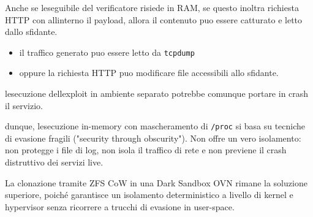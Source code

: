 Anche se l\textquotesingle eseguibile del verificatore risiede in RAM,
se questo inoltra richiesta HTTP con all\textquotesingle interno il
payload, allora il contenuto puo\textquotesingle{} essere catturato e
letto dallo sfidante.

\begin{itemize}
\tightlist
\item
  il traffico generato puo\textquotesingle{} essere letto da
  \passthrough{\lstinline!tcpdump!}
\item
  oppure la richiesta HTTP puo\textquotesingle{} modificare file
  accessibili allo sfidante.
\end{itemize}

l\textquotesingle esecuzione dell\textquotesingle exploit in ambiente
separato potrebbe comunque portare in crash il servizio.

dunque, l\textquotesingle esecuzione in-memory con mascheramento di
\passthrough{\lstinline!/proc!} si basa su tecniche di evasione fragili
("security through obscurity"). Non offre un vero isolamento: non
protegge i file di log, non isola il traffico di rete e non previene il
crash distruttivo dei servizi live.

La clonazione tramite ZFS CoW in una Dark Sandbox OVN rimane la
soluzione superiore, poiché garantisce un isolamento deterministico a
livello di kernel e hypervisor senza ricorrere a trucchi di evasione in
user-space.
